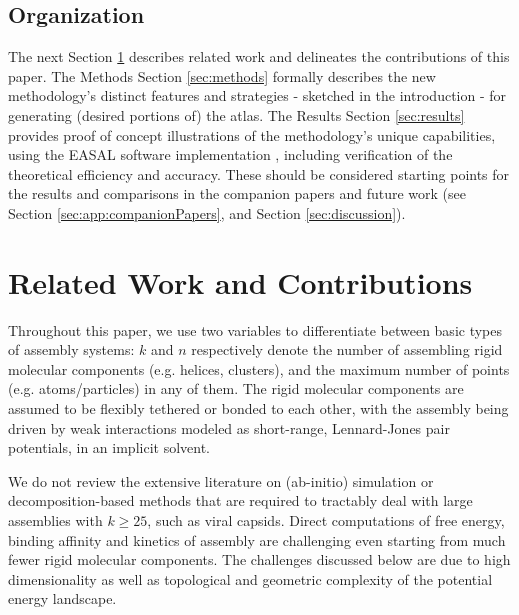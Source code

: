 \documentclass[]{article}
\begin{document}
\subsection*{Organization}
The next Section \ref{sec:related} describes related work and delineates the
contributions of this paper. The Methods Section \ref{sec:methods} formally
describes the new methodology's distinct features and strategies - sketched in
the introduction - for generating (desired portions of) the atlas. The Results
Section \ref{sec:results} provides proof of concept illustrations of the
methodology's unique capabilities, using the EASAL software implementation
\cite{Ozkan:toms,easalVideo,easalSoftware}, including verification of the
theoretical efficiency and accuracy. These should be considered starting points
for the results and comparisons in the companion papers and future work (see
Section \ref{sec:app:companionPapers}, and Section \ref{sec:discussion}).



\section{Related Work and Contributions}
\label{sec:related}
Throughout this paper, we use two variables to differentiate between basic
types of assembly systems: $k$ and $n$ respectively denote the number of
assembling rigid molecular components (e.g. helices, clusters), and the maximum
number of points (e.g. atoms/particles) in any of them. The rigid molecular
components are assumed to be flexibly tethered or bonded to each other, with
the assembly being driven by weak interactions modeled as short-range,
Lennard-Jones pair potentials, in an implicit solvent.

We do not review the extensive literature on (ab-initio) simulation or
decomposition-based methods that are required to tractably deal with large
assemblies with $k \ge 25$, such as viral capsids. Direct computations of free
energy, binding affinity and kinetics of assembly are challenging even starting
from much fewer rigid molecular components. The challenges discussed below are
due to high dimensionality as well as topological and geometric complexity of
the potential energy landscape. 
\end{document}
